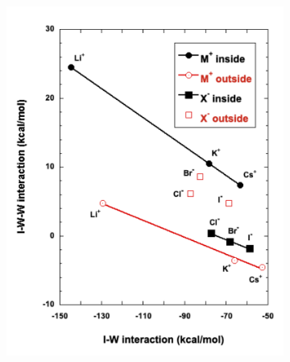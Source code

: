 \documentclass[11pt, proquest]{uwthesis}[2020/02/24]
\begin{document}
\begin{figure}
  \begin{subfigure}[t]{.5\textwidth}
    \centering
    \includegraphics[width=\linewidth]{Figures/Chapter_3/figure_9_bl.pdf}
  \end{subfigure}
  \hfill
  \begin{subfigure}[t]{.5\textwidth}
    \centering

\end{subfigure}
\end{figure}
\end{document}

